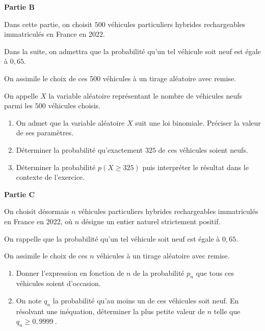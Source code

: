 \documentclass[10pt]{article}
\providecommand{\np}[2][]{{#2~#1}}
\begin{document}
\textbf{Partie B}

\medskip

Dans cette partie, on choisit $500$ véhicules particuliers hybrides rechargeables immatriculés en France en 2022.

Dans la suite, on admettra que la probabilité qu'un tel véhicule soit neuf est égale à $0,65$.

On assimile le choix de ces 500 véhicules à un tirage aléatoire avec remise.

On appelle $X$ la variable aléatoire représentant le nombre de véhicules neufs parmi les $500$ véhicules choisis.

\medskip

\begin{enumerate}
\item On admet que la variable aléatoire $X$ suit une loi binomiale. Préciser la valeur de ses paramètres.
\item Déterminer la probabilité qu'exactement $325$ de ces véhicules soient neufs.
\item Déterminer la probabilité $p(X \geq 325)$ puis interpréter le résultat dans le contexte de l'exercice.
\end{enumerate}

\textbf{Partie C}

\medskip

On choisit désormais $n$ véhicules particuliers hybrides rechargeables immatriculés en France en 2022, où $n$ désigne un entier naturel strictement positif.

On rappelle que la probabilité qu'un tel véhicule soit neuf est égale à $0,65$.

On assimile le choix de ces $n$ véhicules à un tirage aléatoire avec remise.

\medskip

\begin{enumerate}
\item Donner l'expression en fonction de $n$ de la probabilité $p_{n}$ que tous ces véhicules soient d'occasion.

\item On note $q_{n}$ la probabilité qu'au moins un de ces véhicules soit neuf. En résolvant une inéquation, déterminer la plus petite valeur de $n$ telle que $q_{n} \geqslant \np{0,9999}$.
\end{enumerate}
\end{document}
